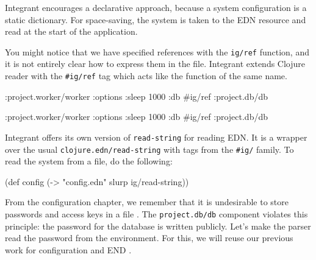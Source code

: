 Integrant encourages a declarative approach, because a system configuration is a static dictionary. For space-saving, the system is taken to the EDN resource and read at the start of the application.


You might notice that we have specified references with the \verb|ig/ref| function, and it is not entirely clear how to express them in the file. Integrant extends Clojure reader with the \verb|#ig/ref| tag which acts like the function of the same name.

\ifnarrow

\begin{english}
  \begin{clojure}
{:project.worker/worker
 {:options {:sleep 1000}
  :db #ig/ref :project.db/db}}
  \end{clojure}
\end{english}

\else

\begin{english}
  \begin{clojure}
{:project.worker/worker {:options {:sleep 1000}
                         :db #ig/ref :project.db/db}}
  \end{clojure}
\end{english}

\fi


Integrant offers its own version of \verb|read-string| for reading EDN. It is a wrapper over the usual \verb|clojure.edn/read-string| with tags from the \verb|#ig/| family. To read the system from a file, do the following:

\begin{english}
  \begin{clojure}
(def config
  (-> "config.edn" slurp ig/read-string))
  \end{clojure}
\end{english}


From the configuration chapter, we remember that it is undesirable to store passwords and access keys in a file . The \verb|project.db/db| component violates this principle: the password for the database is written publicly. Let's make the parser read the password from the environment. For this, we will reuse our previous work for configuration and END .

